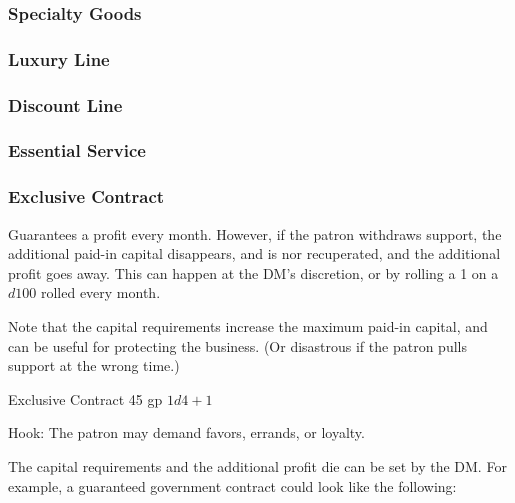 \documentclass[twocolumn]{dndbook}
\begin{document}
\subsubsection{Specialty Goods}


\subsubsection{Luxury Line}


\subsubsection{Discount Line}


\subsubsection{Essential Service}


\subsubsection{Exclusive Contract}
Guarantees a profit every month. However, if the patron withdraws support,
the additional paid-in capital disappears, and is nor recuperated, and
the additional profit goes away. This can happen at the DM's discretion,
or by rolling a 1 on a $d100$ rolled every month.\par

Note that the capital requirements increase the maximum paid-in capital,
and can be useful for protecting the business.
(Or disastrous if the patron pulls support at the wrong time.)\par

\begin{DndMonster}[width=.5\textwidth - 8pt]{Exclusive Contract}
	\hfill 45 gp
	\hfill $1d4 + 1$
\end{DndMonster}

Hook: The patron may demand favors, errands, or loyalty.\par

The capital requirements and the additional profit die can be set by the DM.
For example, a guaranteed government contract could look like the following:
\end{document}
